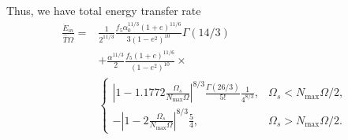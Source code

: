 \documentclass[
        fleqn,
        usenatbib,
        referee,
    ]{mnras}
\newcommand*{\abs}[1]{\left|#1\right|}
\newcommand*{\p}[1]{\left(#1\right)}
\begin{document}
Thus, we have total energy transfer rate
\begin{align}
    \frac{\dot{E}_{in}}{\hat{T}\Omega} ={}&
            \frac{1}{2^{11/3}}
            \frac{f_5 \alpha_0^{11/3}\p{1 + e}^{11/6}}{3\p{1 - e^2}^{10}}
            \Gamma\p{14/3}\nonumber\\
        & + \frac{\alpha^{11/3}}{2}
                \frac{f_5\p{1 + e}^{11/6}}{\p{1 - e^2}^{10}}
                \times\nonumber\\
        &\begin{cases}
            \abs{1 - 1.1772\frac{\Omega_s}{N_{\max}\Omega}}^{8/3}
                \frac{\Gamma(26/3)}{5!}\frac{1}{4^{8/3}},
                & \Omega_s < N_{\max}\Omega/2,\\[5pt]
            -\abs{1 - 2\frac{\Omega_s}{N_{\max}\Omega}}^{8/3}\frac{5}{4},
                & \Omega_s > N_{\max}\Omega/2.
        \end{cases}\label{eq:edot_in}
\end{align}






\bsp
\label{lastpage} %
\end{document}
